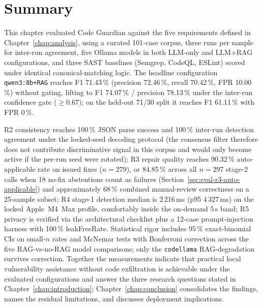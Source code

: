 









\section{Summary}
\label{sec:eval-summary}

This chapter evaluated Code Guardian against the five requirements defined in Chapter~\ref{chap:analysis}, using a curated 101-case corpus, three runs per sample for inter-run agreement, five Ollama models in both LLM-only and LLM+RAG configurations, and three SAST baselines (Semgrep, CodeQL, ESLint) scored under identical canonical-matching logic. The headline configuration \texttt{qwen3:8b+RAG} reaches F1 71.43\,\% (precision 72.46\,\%, recall 70.42\,\%, FPR 10.00\,\%) without gating, lifting to F1 74.07\,\% / precision 78.13\,\% under the inter-run confidence gate ($\geq 0.67$); on the held-out 71/30 split it reaches F1 61.11\,\% with FPR 0\,\%.

R2 consistency reaches 100\,\% JSON parse success and 100\,\% inter-run detection agreement under the locked-seed decoding protocol (the consensus filter therefore does not contribute discriminative signal in this corpus and would only become active if the per-run seed were rotated); R3 repair quality reaches 90.32\,\% auto-applicable rate on issued fixes ($n=279$), or 84.85\,\% across all $n=297$ stage-2 calls when 18 no-fix abstentions count as failures (Section~\ref{sec:eval-r3-auto-applicable}) and approximately 68\,\% combined manual-review correctness on a 25-sample subset; R4 stage-1 detection median is 2\,216\,ms (p95 4\,327\,ms) on the locked Apple~M4~Max profile, comfortably inside the on-demand 5\,s band; R5 privacy is verified via the architectural checklist plus a 12-case prompt-injection harness with 100\,\% leakFreeRate. Statistical rigor includes 95\,\% exact-binomial CIs on small-$n$ rates and McNemar tests with Bonferroni correction across the five RAG-vs-no-RAG model comparisons; only the \texttt{codellama} RAG-degradation survives correction. Together the measurements indicate that practical local vulnerability assistance without code exfiltration is achievable under the evaluated configurations and answer the three research questions stated in Chapter~\ref{chap:introduction}; Chapter~\ref{chap:conclusion} consolidates the findings, names the residual limitations, and discusses deployment implications.
